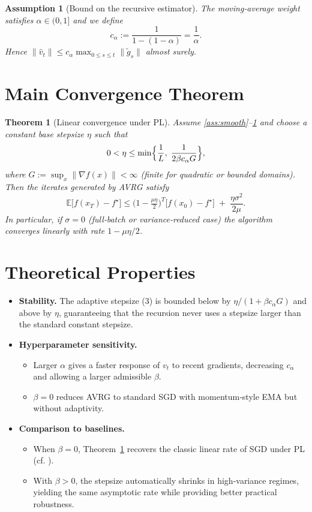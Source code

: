 \documentclass{article}
\newtheorem{theorem}{Theorem}
\newtheorem{assumption}{Assumption}
\begin{document}
\begin{assumption}[Bound on the recursive estimator]\label{ass:bound}
The moving‑average weight satisfies $\alpha\in(0,1]$ and we define
\[
c_\alpha:=\frac{1}{1-(1-\alpha)}=\frac{1}{\alpha}.
\]
Hence $\|\hat v_t\|\le c_\alpha\max_{0\le s\le t}\|\tilde g_s\|$ almost surely.
\end{assumption}

\section*{Main Convergence Theorem}
\begin{theorem}[Linear convergence under PL]\label{thm:linear}
Assume \ref{ass:smooth}–\ref{ass:bound} and choose a constant base stepsize $\eta$ such that
\[
0<\eta\le \min\Bigl\{\frac{1}{L},\;\frac{1}{2\beta c_\alpha G}\Bigr\},
\]
where $G:=\sup_{x}\|\nabla f(x)\|<\infty$ (finite for quadratic or bounded domains).  
Then the iterates generated by AVRG satisfy
\[
\mathbb{E}\bigl[f(x_T)-f^\star\bigr]\le
\bigl(1-\tfrac{\mu\eta}{2}\bigr)^{T}\bigl[f(x_0)-f^\star\bigr]
\;+\;
\frac{\eta\sigma^{2}}{2\mu}.
\tag{5}
\]
In particular, if $\sigma=0$ (full‑batch or variance‑reduced case) the algorithm converges linearly with rate $1-\mu\eta/2$.
\end{theorem}

\section*{Theoretical Properties}
\begin{itemize}
\item \textbf{Stability.} The adaptive stepsize (3) is bounded below by $\eta/(1+\beta c_\alpha G)$ and above by $\eta$, guaranteeing that the recursion never uses a stepsize larger than the standard constant stepsize.
\item \textbf{Hyperparameter sensitivity.}
    \begin{itemize}
        \item Larger $\alpha$ gives a faster response of $v_t$ to recent gradients, decreasing $c_\alpha$ and allowing a larger admissible $\beta$.
        \item $\beta=0$ reduces AVRG to standard SGD with momentum‑style EMA but without adaptivity.
    \end{itemize}
\item \textbf{Comparison to baselines.}
    \begin{itemize}
        \item When $\beta=0$, Theorem~\ref{thm:linear} recovers the classic linear rate of SGD under PL (cf. \cite{karimi2016linear}).
        \item With $\beta>0$, the stepsize automatically shrinks in high‑variance regimes, yielding the same asymptotic rate while providing better practical robustness.
    \end{itemize}
\end{itemize}
\end{document}
